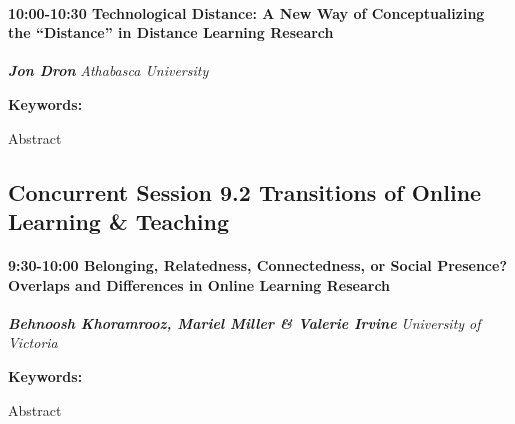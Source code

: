 \documentclass[
]{book}
\begin{document}
\begin{session}
\hypertarget{technological-distance-a-new-way-of-conceptualizing-the-distance-in-distance-learning-research}{%
\paragraph*{\texorpdfstring{10:00-10:30 \textbar{} \textbf{Technological
Distance: A New Way of Conceptualizing the ``Distance'' in Distance
Learning} \textbar{}
Research}{10:00-10:30 \textbar{} Technological Distance: A New Way of Conceptualizing the ``Distance'' in Distance Learning \textbar{} Research}}\label{technological-distance-a-new-way-of-conceptualizing-the-distance-in-distance-learning-research}}

\textbf{\emph{Jon Dron}} \textbar{} \emph{Athabasca University}

\textbf{Keywords:}

Abstract
\end{session}

\hypertarget{concurrent-session-9.2-transitions-of-online-learning-teaching}{%
\subsection*{Concurrent Session 9.2 \textbar{} Transitions of Online Learning \& Teaching}\label{concurrent-session-9.2-transitions-of-online-learning-teaching}}

\begin{session}
\hypertarget{belonging-relatedness-connectedness-or-social-presence-overlaps-and-differences-in-online-learning-research}{%
\paragraph*{\texorpdfstring{9:30-10:00 \textbar{} \textbf{Belonging,
Relatedness, Connectedness, or Social Presence? Overlaps and Differences
in Online Learning} \textbar{}
Research}{9:30-10:00 \textbar{} Belonging, Relatedness, Connectedness, or Social Presence? Overlaps and Differences in Online Learning \textbar{} Research}}\label{belonging-relatedness-connectedness-or-social-presence-overlaps-and-differences-in-online-learning-research}}

\textbf{\emph{Behnoosh Khoramrooz, Mariel Miller \& Valerie Irvine}}
\textbar{} \emph{University of Victoria}

\textbf{Keywords:}

Abstract
\end{session}
\end{document}
